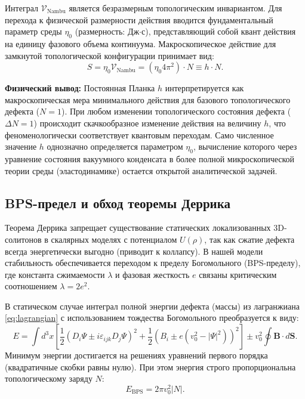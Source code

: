 \documentclass[11pt,a4paper]{article}
\begin{document}
Интеграл $\mathcal{V}_{\text{Nambu}}$ является безразмерным топологическим инвариантом. Для перехода к физической размерности действия вводится фундаментальный параметр среды $\eta_0$ (размерность: Дж$\cdot$с), представляющий собой квант действия на единицу фазового объема континуума. Макроскопическое действие для замкнутой топологической конфигурации принимает вид:
\begin{equation}
	S = \eta_0 \mathcal{V}_{\text{Nambu}} = (\eta_0 4\pi^2) \cdot N \equiv h \cdot N.
\end{equation}

\textbf{Физический вывод:} Постоянная Планка $h$ интерпретируется как макроскопическая мера минимального действия для базового топологического дефекта ($N=1$). При любом изменении топологического состояния дефекта ($\Delta N = 1$) происходит скачкообразное изменение действия на величину $h$, что феноменологически соответствует квантовым переходам. Само численное значение $h$ однозначно определяется параметром $\eta_0$, вычисление которого через уравнение состояния вакуумного конденсата в более полной микроскопической теории среды (эластодинамике) остается открытой аналитической задачей.
	
\subsection{BPS-предел и обход теоремы Деррика}
Теорема Деррика запрещает существование статических локализованных 3D-солитонов в скалярных моделях с потенциалом $U(\rho)$, так как сжатие дефекта всегда энергетически выгодно (приводит к коллапсу). 
В нашей модели стабильность обеспечивается переходом к пределу Богомольного (BPS-пределу), где константа сжимаемости $\lambda$ и фазовая жесткость $e$ связаны критическим соотношением $\lambda = 2e^2$.
	
В статическом случае интеграл полной энергии дефекта (массы) из лагранжиана \eqref{eq:lagrangian} с использованием тождества Богомольного преобразуется к виду:
\begin{equation}
E = \int d^3x \left[ \frac{1}{2} \left( D_i \Psi \pm i \varepsilon_{ijk} D_j \Psi \right)^2 + \frac{1}{2} \left( B_i \pm e(v_0^2 - |\Psi|^2) \right)^2 \right] \pm v_0^2 \oint \mathbf{B} \cdot d\mathbf{S}.
\end{equation}
Минимум энергии достигается на решениях уравнений первого порядка (квадратичные скобки равны нулю). При этом энергия строго пропорциональна топологическому заряду $N$:
\begin{equation}
E_{\text{BPS}} = 2\pi v_0^2 |N|.
\label{eq:bps_energy}
\end{equation}
	
\end{document}
